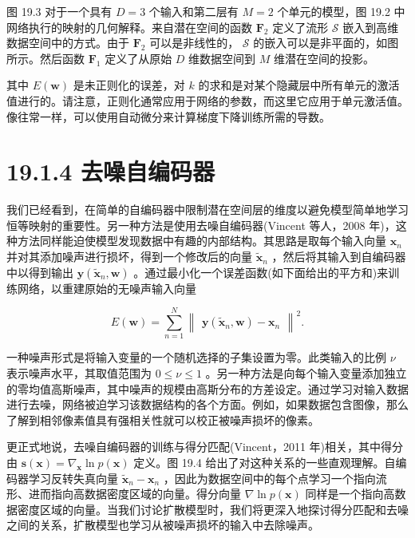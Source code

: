\documentclass[10pt]{report}
\begin{document}
图 19.3 对于一个具有 \(D = 3\) 个输入和第二层有 \(M = 2\) 个单元的模型，图 19.2 中网络执行的映射的几何解释。来自潜在空间的函数 \({\mathbf{F}}_{2}\) 定义了流形 \(\mathcal{S}\) 嵌入到高维数据空间中的方式。由于 \({\mathbf{F}}_{2}\) 可以是非线性的， \(\mathcal{S}\) 的嵌入可以是非平面的，如图所示。然后函数 \({\mathbf{F}}_{1}\) 定义了从原始 \(D\) 维数据空间到 \(M\) 维潜在空间的投影。

其中 \(E\left( \mathbf{w}\right)\) 是未正则化的误差，对 \(k\) 的求和是对某个隐藏层中所有单元的激活值进行的。请注意，正则化通常应用于网络的参数，而这里它应用于单元激活值。像往常一样，可以使用自动微分来计算梯度下降训练所需的导数。

\section*{19.1.4 去噪自编码器}

我们已经看到，在简单的自编码器中限制潜在空间层的维度以避免模型简单地学习恒等映射的重要性。另一种方法是使用去噪自编码器(Vincent 等人，2008 年)，这种方法同样能迫使模型发现数据中有趣的内部结构。其思路是取每个输入向量 \({\mathbf{x}}_{n}\) 并对其添加噪声进行损坏，得到一个修改后的向量 \({\widetilde{\mathbf{x}}}_{n}\) ，然后将其输入到自编码器中以得到输出 \(\mathbf{y}\left( {{\widetilde{\mathbf{x}}}_{n},\mathbf{w}}\right)\) 。通过最小化一个误差函数(如下面给出的平方和)来训练网络，以重建原始的无噪声输入向量

\[
E\left( \mathbf{w}\right)  = \mathop{\sum }\limits_{{n = 1}}^{N}{\begin{Vmatrix}\mathbf{y}\left( {\widetilde{\mathbf{x}}}_{n},\mathbf{w}\right)  - {\mathbf{x}}_{n}\end{Vmatrix}}^{2}. \tag{19.3}
\]

一种噪声形式是将输入变量的一个随机选择的子集设置为零。此类输入的比例 \(\nu\) 表示噪声水平，其取值范围为 \(0 \leq  \nu  \leq  1\) 。另一种方法是向每个输入变量添加独立的零均值高斯噪声，其中噪声的规模由高斯分布的方差设定。通过学习对输入数据进行去噪，网络被迫学习该数据结构的各个方面。例如，如果数据包含图像，那么了解到相邻像素值具有强相关性就可以校正被噪声损坏的像素。

更正式地说，去噪自编码器的训练与得分匹配(Vincent，2011 年)相关，其中得分由 \(\mathbf{s}\left( \mathbf{x}\right)  = {\nabla }_{\mathbf{x}}\ln p\left( \mathbf{x}\right)\) 定义。图 19.4 给出了对这种关系的一些直观理解。自编码器学习反转失真向量 \({\widetilde{\mathbf{x}}}_{n} - {\mathbf{x}}_{n}\) ，因此为数据空间中的每个点学习一个指向流形、进而指向高数据密度区域的向量。得分向量 \(\nabla \ln p\left( \mathbf{x}\right)\) 同样是一个指向高数据密度区域的向量。当我们讨论扩散模型时，我们将更深入地探讨得分匹配和去噪之间的关系，扩散模型也学习从被噪声损坏的输入中去除噪声。
\end{document}
